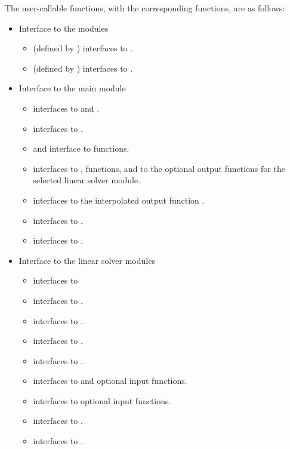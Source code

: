 The user-callable functions, with the corresponding {\cvode} functions,
are as follows:
\begin{itemize}
\item
  Interface to the {\nvector} modules
  \begin{itemize}
  \item {} (defined by {\nvecs}) 
    interfaces to .
  \item {} (defined by {\nvecp}) 
    interfaces to .
  \end{itemize}
\item Interface to the main {\cvode} module
  \begin{itemize}
  \item {}
    interfaces to  and .
  \item {}  
    interfaces to .
  \item {} and 
    interface to  functions.
  \item {}
    interfaces to ,  functions, and to the optional
    output functions for the selected linear solver module.
  \item {}     
    interfaces to the interpolated output function .
  \item {}    
    interfaces to .
  \item {}    
    interfaces to .
  \end{itemize}  
\item Interface to the linear solver modules
  \begin{itemize}
  \item {}    
    interfaces to 
  \item {}
    interfaces to .
  \item {}
    interfaces to .
  \item {}
    interfaces to .
  \item {}
    interfaces to .
  \item {}
    interfaces to  and {\spgmr} optional input functions.
  \item {} 
    interfaces to {\spgmr} optional input functions.
  \item {}
   interfaces to .
 \item {}
   interfaces to .
 \end{itemize}

\end{itemize}

